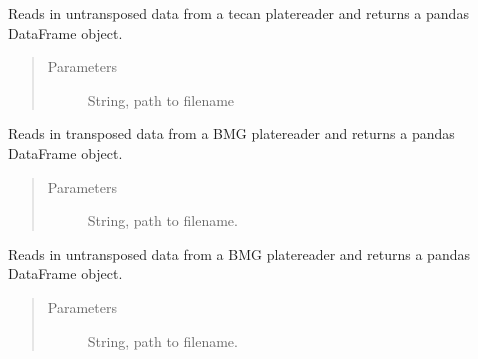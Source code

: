 \documentclass[letterpaper,10pt,english]{sphinxmanual}
\begin{document}

\begin{fulllineitems}
\label{\detokenize{platelib:platelib.plateread.read_tecan}}
Reads in untransposed data from a tecan platereader and returns a pandas DataFrame object.
\begin{quote}\begin{description}
\item[{Parameters}] \leavevmode
{} \textendash{} String, path to filename

\end{description}\end{quote}

\end{fulllineitems}


\begin{fulllineitems}
\label{\detokenize{platelib:platelib.plateread.read_transposed_bmg}}
Reads in transposed data from a BMG platereader and returns a pandas DataFrame object.
\begin{quote}\begin{description}
\item[{Parameters}] \leavevmode
{} \textendash{} String, path to filename.

\end{description}\end{quote}

\end{fulllineitems}


\begin{fulllineitems}
\label{\detokenize{platelib:platelib.plateread.read_untransposed_bmg}}
Reads in untransposed data from a BMG platereader and returns a pandas DataFrame object.
\begin{quote}\begin{description}
\item[{Parameters}] \leavevmode
{} \textendash{} String, path to filename.

\end{description}\end{quote}

\end{fulllineitems}
\end{document}
